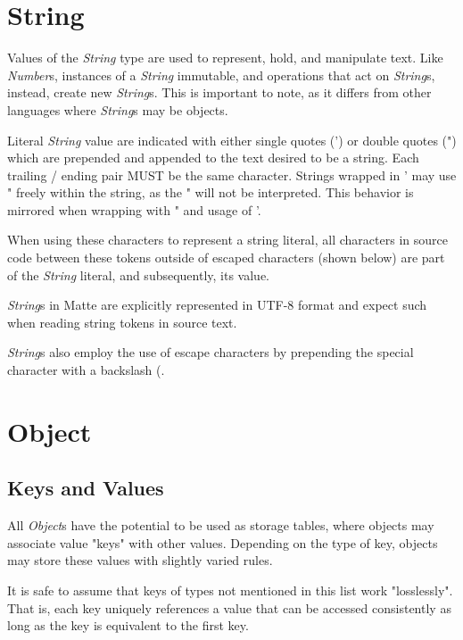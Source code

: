 \documentclass[12pt,letterpaper]{report}
\begin{document}
\section{String}\label{String}

Values of the \textit{String} type are used to represent, hold, and manipulate text.
Like \textit{Number}s, instances of a \textit{String} immutable, and operations 
that act on \textit{String}s, instead, create new \textit{String}s. This is 
important to note, as it differs from other languages where \textit{String}s 
may be objects.

Literal \textit{String} value are indicated with either single quotes (') or double quotes (")
which are prepended and appended to the text desired to be a string. Each trailing /
ending pair MUST be the same character. Strings wrapped in ' may use " freely within 
the string, as the " will not be interpreted. This behavior is mirrored when wrapping with " and usage of '.

When using these characters to represent a string literal, all characters in source code between these tokens 
outside of escaped characters (shown below) are part of the \textit{String} literal, and subsequently, 
its value.



\textit{String}s in Matte are explicitly represented in UTF-8 format and expect such 
when reading string tokens in source text.




\textit{String}s also employ the use of escape characters by prepending the special 
character with a backslash (\).






\section{Object}\label{Object}
\subsection{Keys and Values}\label{Keys and Values}

All \textit{Object}s have the potential to be used as storage tables, where objects may associate 
value "keys" with other values. Depending on the type of key, objects may store these values 
with slightly varied rules. 

It is safe to assume that keys of types not mentioned in this list work "losslessly". That is, 
each key uniquely references a value that can be accessed consistently as long as the 
key is equivalent to the first key.
\end{document}
